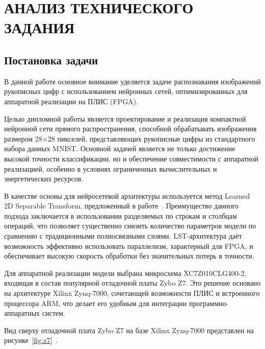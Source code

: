 \chapter[Анализ технического задания]{АНАЛИЗ ТЕХНИЧЕСКОГО ЗАДАНИЯ}

\section{Постановка задачи}

\hspace*{12.5 mm}В данной работе основное внимание уделяется задаче 
распознавания изображений рукописных цифр с использованием нейронных сетей, 
оптимизированных для аппаратной реализации на ПЛИС (FPGA).

Целью дипломной работы является проектирование и реализация компактной 
нейронной сети прямого распространения, способной обрабатывать изображения 
размером 28$\times$28 пикселей, представляющих рукописные цифры из 
стандартного набора данных MNIST. Основной задачей является не только 
достижение высокой точности классификации, но и обеспечение совместимости с 
аппаратной реализацией, особенно в условиях ограниченных вычислительных и 
энергетических ресурсов.

В качестве основы для нейросетевой архитектуры используется метод Learned 2D 
Separable Transform, предложенный в работе~\cite{LST2D}. Преимущество данного 
подхода заключается в использовании разделяемых по строкам и столбцам операций, 
что позволяет существенно снизить количество параметров модели по сравнению с 
традиционными полносвязными слоями. LST-архитектура даёт возможность эффективно 
использовать параллелизм, характерный для FPGA, и обеспечивает высокую скорость 
обработки без значительных потерь в точности.

Для аппаратной реализации модели выбрана микросхема XC7Z010CLG400-2, входящая в 
состав популярной отладочной платы Zybo Z7. Это решение основано на архитектуре 
Xilinx Zynq-7000, сочетающей возможности ПЛИС и встроенного процессора ARM, что 
делает его удобным для интеграции программно-аппаратных систем.

Вид сверху отладочной плата Zybo Z7 на базе Xilinx Zynq-7000
представлен на рисунке~\ref{fig:z7}~\cite{ZYBO}.

